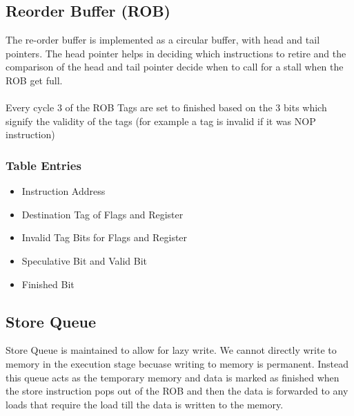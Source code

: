 \documentclass{article}
\begin{document}
\subsection{Reorder Buffer (ROB)}
The re-order buffer is implemented as a circular buffer, with head and tail pointers. The head pointer helps in deciding which instructions to retire and the comparison of the head and tail pointer decide when to call for a stall when the ROB get full. \\ \\
Every cycle 3 of the ROB Tags are set to finished based on the 3 bits which signify the validity of the tags (for example a tag is invalid if it was NOP instruction)
\subsubsection{Table Entries}
\begin{itemize}
\item Instruction Address
\item Destination Tag of Flags and Register
\item Invalid Tag Bits for Flags and Register
\item Speculative Bit and Valid Bit
\item Finished Bit
\end{itemize}
\subsection{Store Queue}
Store Queue is maintained to allow for lazy write. We cannot directly write to memory in the execution stage becuase writing to memory is permanent. Instead this queue acts as the temporary memory and data is marked as finished when the store instruction pops out of the ROB and then the data is forwarded to any loads that require the load till the data is written to the memory.
\end{document}
